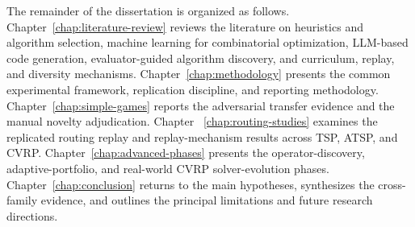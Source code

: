 The remainder of the dissertation is organized as follows. Chapter~\ref{chap:literature-review}
reviews the literature on heuristics and algorithm selection, machine learning for combinatorial
optimization, LLM-based code generation, evaluator-guided algorithm discovery, and curriculum,
replay, and diversity mechanisms. Chapter~\ref{chap:methodology} presents the common experimental
framework, replication discipline, and reporting methodology. Chapter~\ref{chap:simple-games}
reports the adversarial transfer evidence and the manual novelty adjudication. Chapter~
\ref{chap:routing-studies} examines the replicated routing replay and replay-mechanism results
across TSP, ATSP, and CVRP. Chapter~\ref{chap:advanced-phases} presents the operator-discovery,
adaptive-portfolio, and real-world CVRP solver-evolution phases. Chapter~\ref{chap:conclusion}
returns to the main hypotheses, synthesizes the cross-family evidence, and outlines the principal
limitations and future research directions.
